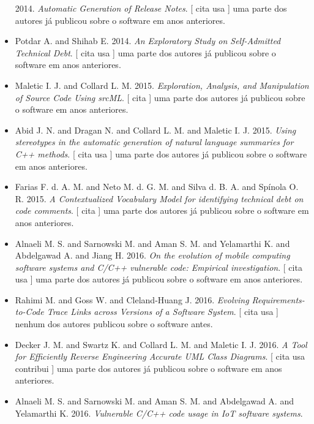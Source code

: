 \begin{itemize}
      2014.
        \textit{ Automatic Generation of Release Notes}.
      [
          cita
          usa
      ]
uma parte dos autores já publicou sobre o software em anos anteriores.
\item Potdar A. and Shihab E.
      2014.
        \textit{ An Exploratory Study on Self-Admitted Technical Debt}.
      [
          cita
          usa
      ]
uma parte dos autores já publicou sobre o software em anos anteriores.
\item Maletic I. J. and Collard L. M.
      2015.
        \textit{ Exploration, Analysis, and Manipulation of Source Code Using srcML}.
      [
          cita
      ]
uma parte dos autores já publicou sobre o software em anos anteriores.
\item Abid J. N. and Dragan N. and Collard L. M. and Maletic I. J.
      2015.
        \textit{ Using stereotypes in the automatic generation of natural language summaries for C++ methods}.
      [
          cita
          usa
      ]
uma parte dos autores já publicou sobre o software em anos anteriores.
\item Farias F. d. A. M. and Neto M. d. G. M. and Silva d. B. A. and Spínola O. R.
      2015.
        \textit{ A Contextualized Vocabulary Model for identifying technical debt on code comments}.
      [
          cita
      ]
uma parte dos autores já publicou sobre o software em anos anteriores.
\item Alnaeli M. S. and Sarnowski M. and Aman S. M. and Yelamarthi K. and Abdelgawad A. and Jiang H.
      2016.
        \textit{ On the evolution of mobile computing software systems and C/C++ vulnerable code: Empirical investigation}.
      [
          cita
          usa
      ]
uma parte dos autores já publicou sobre o software em anos anteriores.
\item Rahimi M. and Goss W. and Cleland-Huang J.
      2016.
        \textit{ Evolving Requirements-to-Code Trace Links across Versions of a Software System}.
      [
          cita
          usa
      ]
nenhum dos autores publicou sobre o software antes.
\item Decker J. M. and Swartz K. and Collard L. M. and Maletic I. J.
      2016.
        \textit{ A Tool for Efficiently Reverse Engineering Accurate UML Class Diagrams}.
      [
          cita
          usa
          contribui
      ]
uma parte dos autores já publicou sobre o software em anos anteriores.
\item Alnaeli M. S. and Sarnowski M. and Aman S. M. and Abdelgawad A. and Yelamarthi K.
      2016.
        \textit{ Vulnerable C/C++ code usage in IoT software systems}.

\end{itemize}

